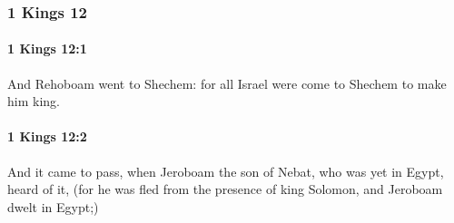 	\subsubsection{1 Kings 12} %
		\label{1KINGS-12}

		\paragraph{1 Kings 12:1} %
			\label{1KINGS-12-1}

			And Rehoboam went to Shechem: for all Israel were come to Shechem to make him king.


		\paragraph{1 Kings 12:2} %
			\label{1KINGS-12-2}

			And it came to pass, when Jeroboam the son of Nebat, who was yet in Egypt, heard of it, (for he was fled from the presence of king Solomon, and Jeroboam dwelt in Egypt;)

